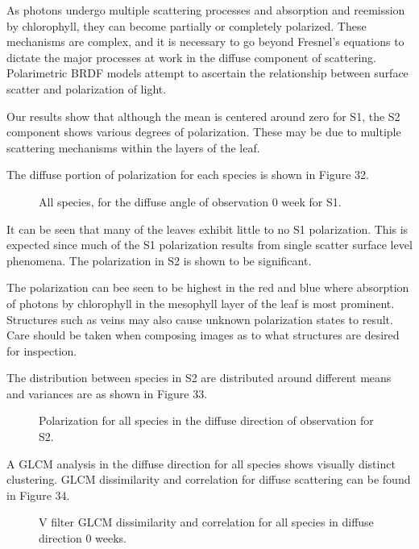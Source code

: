 As photons undergo multiple scattering processes and absorption and reemission by chlorophyll, they can become partially or completely polarized.  These mechanisms are complex, and it is necessary to go beyond Fresnel’s equations to dictate the major processes at work in the diffuse component of scattering.  Polarimetric BRDF models attempt to ascertain the relationship between surface scatter and polarization of light.

Our results show that although the mean is centered around zero for S1, the S2 component shows various degrees of polarization.  These may be due to multiple scattering mechanisms within the layers of the leaf.

The diffuse portion of polarization for each species is shown in Figure 32.
%
\begin{figure}[!htb]
    \begin{center}
    \end{center}
    \caption{All species, for the diffuse angle of observation 0 week for S1.}
    \label{fig:polarization}
\end{figure}
%
It can be seen that many of the leaves exhibit little to no S1 polarization.  This is expected since much of the S1 polarization results from single scatter surface level phenomena.  The polarization in S2 is shown to be significant.

The polarization can bee seen to be highest in the red and blue where absorption of photons by chlorophyll in the mesophyll layer of the leaf is most prominent.  Structures such as veins may also cause unknown polarization states to result.  Care should be taken when composing images as to what structures are desired for inspection.

The distribution between species in S2 are distributed around different means and variances are as shown in Figure 33.
%
\begin{figure}[!htb]
    \begin{center}
    \end{center}
    \caption{Polarization for all species in the diffuse direction of observation for S2.}
    \label{fig:polarization}
\end{figure}
%
A GLCM analysis in the diffuse direction for all species shows visually distinct clustering.  GLCM dissimilarity and correlation for diffuse scattering can be found in Figure 34.
%
\begin{figure}[!htb]
    \begin{center}
    \end{center}
    \caption{V filter GLCM dissimilarity and correlation for all species in diffuse direction 0 weeks.}
    \label{fig:polarization}
\end{figure}
%
